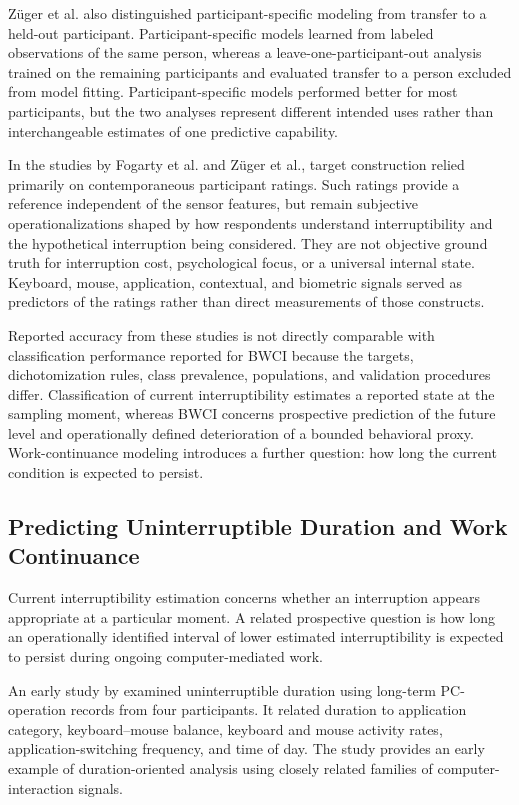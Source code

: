 Züger et al. also distinguished participant-specific modeling from transfer to a held-out participant. Participant-specific models learned from labeled observations of the same person, whereas a leave-one-participant-out analysis trained on the remaining participants and evaluated transfer to a person excluded from model fitting. Participant-specific models performed better for most participants, but the two analyses represent different intended uses rather than interchangeable estimates of one predictive capability.

In the studies by Fogarty et al. and Züger et al., target construction relied primarily on contemporaneous participant ratings. Such ratings provide a reference independent of the sensor features, but remain subjective operationalizations shaped by how respondents understand interruptibility and the hypothetical interruption being considered. They are not objective ground truth for interruption cost, psychological focus, or a universal internal state. Keyboard, mouse, application, contextual, and biometric signals served as predictors of the ratings rather than direct measurements of those constructs.

Reported accuracy from these studies is not directly comparable with classification performance reported for BWCI because the targets, dichotomization rules, class prevalence, populations, and validation procedures differ. Classification of current interruptibility estimates a reported state at the sampling moment, whereas BWCI concerns prospective prediction of the future level and operationally defined deterioration of a bounded behavioral proxy. Work-continuance modeling introduces a further question: how long the current condition is expected to persist.

\subsection{Predicting Uninterruptible Duration and Work Continuance}

Current interruptibility estimation concerns whether an interruption appears appropriate at a particular moment. A related prospective question is how long an operationally identified interval of lower estimated interruptibility is expected to persist during ongoing computer-mediated work.

An early study by \textcite{iga2015uninterruptibleDuration} examined uninterruptible duration using long-term PC-operation records from four participants. It related duration to application category, keyboard--mouse balance, keyboard and mouse activity rates, application-switching frequency, and time of day. The study provides an early example of duration-oriented analysis using closely related families of computer-interaction signals.

